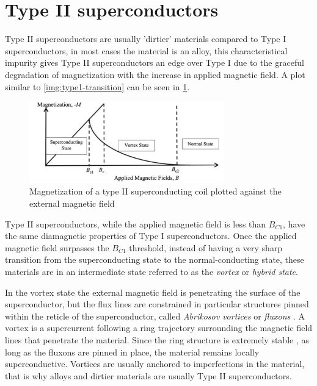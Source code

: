 \section{Type II superconductors}
\label{sec:type2}
Type II superconductors are usually 'dirtier' materials compared to Type I superconductors, in most
cases the material is an alloy, this characteristical impurity gives Type II superconductors an edge
over Type I due to the graceful degradation of magnetization with the increase in applied magnetic
field. A plot similar to \cref{img:type1-transition} can be seen in \cref{img:type2-transition}.
\begin{figure}
	\centering
	\includegraphics[width=0.75\textwidth]{./img/type2.png}
	\caption{Magnetization of a type II superconducting coil plotted against the external magnetic field
		\cite{slimani2022superconducting}}
	\label{img:type2-transition}
\end{figure}

\medskip

Type II superconductors, while the applied magnetic field is less than $B_{C1}$, have the same
diamagnetic properties of Type I superconductors. Once the applied magnetic field surpasses the
$B_{C1}$ threshold, instead of having a very sharp transition from the superconducting state to
the normal-conducting state, these materials are in an intermediate state referred to as the \emph{vortex} or \emph{hybrid state}.

\medskip

In the vortex state the external magnetic field is penetrating the surface of the superconductor, but the
flux lines are constrained in particular structures pinned within the reticle of the
superconductor, called \emph{Abrikosov vortices} or \emph{fluxons} \cite{abrikosov-vortices}.
A vortex is a supercurrent following a ring trajectory surrounding the magnetic field lines that
penetrate the material. Since the ring structure is extremely stable \cite{fujita-theory-HTS}, as long as the
fluxons are pinned in place, the material remains
locally superconductive. Vortices are usually anchored to imperfections in the material, that is why alloys and dirtier materials are usually Type II superconductors.

